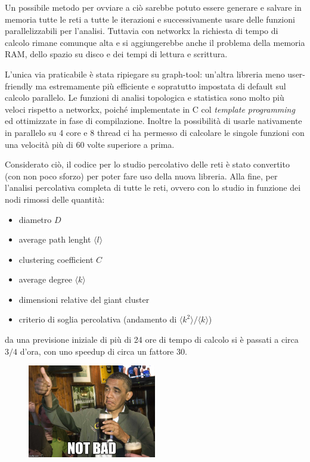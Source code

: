 Un possibile metodo per ovviare a ciò sarebbe potuto essere generare e salvare in memoria tutte le reti a tutte le iterazioni e successivamente usare delle funzioni parallelizzabili per l'analisi. Tuttavia con networkx la richiesta di tempo di calcolo rimane comunque alta e si aggiungerebbe anche il problema della memoria RAM, dello spazio su disco e dei tempi di lettura e scrittura.

L'unica via praticabile è stata ripiegare su graph-tool: un'altra libreria meno user-friendly ma estremamente più efficiente e sopratutto impostata di default sul calcolo parallelo. Le funzioni di analisi topologica e statistica sono molto più veloci rispetto a networkx, poiché implementate in C col \emph{template programming} ed ottimizzate in fase di compilazione. Inoltre la possibilità di usarle nativamente in parallelo su 4 core e 8 thread ci ha permesso di calcolare le singole funzioni con una velocità più di 60 volte superiore a prima.

Considerato ciò, il codice per lo studio percolativo delle reti è stato convertito (con non poco sforzo) per poter fare uso della nuova libreria. Alla fine, per l'analisi percolativa completa di tutte le reti, ovvero con lo studio in funzione dei nodi rimossi delle quantità:

\begin{itemize}
 \item   diametro $D$
 \item   average path lenght $\langle l \rangle$
 \item   clustering coefficient $C$
 \item   average degree $\langle k \rangle$
 \item   dimensioni relative del giant cluster
 \item   criterio di soglia percolativa (andamento di $\langle k^2 \rangle / \langle k \rangle$)
\end{itemize}

da una previsione iniziale di più di 24 ore di tempo di calcolo si è passati a circa $3/4$ d'ora, con uno speedup di circa un fattore 30.

\begin{figure}[h!]
	\centering
	\includegraphics[width=0.5\textwidth]{./Immagini/Attack/meme_Obama.jpg}
\end{figure}
\clearpage

